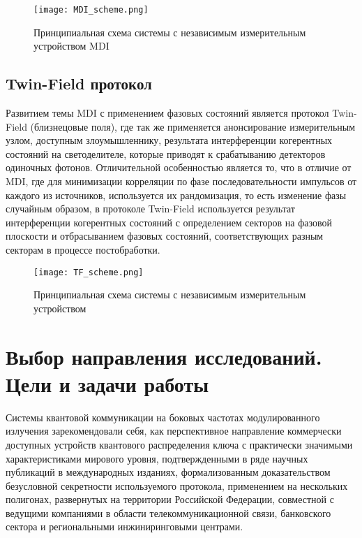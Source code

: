  \begin{figure}[ht]
  \centering
  \texttt{[image: MDI\_scheme.png]}
  \caption{Принципиальная схема системы с независимым измерительным устройством MDI}
  \label{fig:MDI_scheme}
\end{figure}


\subsection{Twin-Field протокол} \label{subsec:ch1/sec7/sub4}


Развитием темы MDI с применением фазовых состояний является протокол Twin-Field (близнецовые поля), где так же применяется анонсирование измерительным узлом, доступным злоумышленнику, результата интерференции когерентных состояний на светоделителе, которые приводят к срабатыванию детекторов одиночных фотонов. Отличительной особенностью является то, что в отличие от MDI, где для минимизации корреляции по фазе последовательности импульсов от каждого из источников, используется их рандомизация, то есть изменение фазы случайным образом, в протоколе Twin-Field используется результат интерференции когерентных состояний с определением секторов на фазовой плоскости и отбрасыванием фазовых состояний, соответствующих разным секторам в процессе постобработки.

 
 \begin{figure}[ht]
  \centering
  \texttt{[image: TF\_scheme.png]}
  \caption{Принципиальная схема системы с независимым измерительным устройством}
  \label{fig:TF_scheme}
\end{figure}

\section{Выбор направления исследований. Цели и задачи работы} \label{sec:ch1/sec8}

Системы квантовой коммуникации на боковых частотах модулированного излучения зарекомендовали себя, как перспективное направление коммерчески доступных устройств квантового распределения ключа с практически значимыми характеристиками мирового уровня, подтвержденными в ряде научных публикаций в международных изданиях, формализованным доказательством безусловной секретности используемого протокола, применением на нескольких полигонах, развернутых на территории Российской Федерации, совместной с ведущими компаниями в области телекоммуникационной связи, банковского сектора и региональными инжиниринговыми центрами. 


